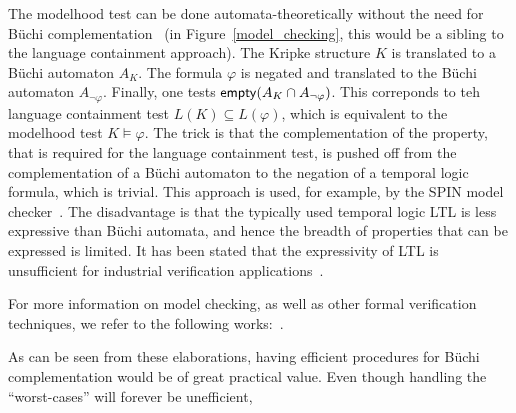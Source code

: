 The modelhood test can be done automata-theoretically without the need for Büchi complementation~\cite{2007_vardi_model_checking} (in Figure~\ref{model_checking}, this would be a sibling to the language containment approach). The Kripke structure $K$ is translated to a Büchi automaton $A_K$. The formula $\varphi$ is negated and translated to the Büchi automaton $A_{\neg\varphi}$. Finally, one tests $\text{\textsf{empty}}(A_K \cap A_{\neg\varphi})$. This correponds to teh language containment test $L(K) \subseteq L(\varphi)$, which is equivalent to the modelhood test $K \models \varphi$. The trick is that the complementation of the property, that is required for the language containment test, is pushed off from the complementation of a Büchi automaton to the negation of a temporal logic formula, which is trivial. This approach is used, for example, by the SPIN model checker~\cite{1997_spin}. The disadvantage is that the typically used temporal logic LTL is less expressive than Büchi automata, and hence the breadth of properties that can be expressed is limited. It has been stated that the expressivity of LTL is unsufficient for industrial verification applications~\cite{2007_vardi_model_checking}.

For more information on model checking, as well as other formal verification techniques, we refer to the following works:~\cite{huth2004logic}\cite{ben2012mathematical}\cite{baier2008principles}.

As can be seen from these elaborations, having efficient procedures for Büchi complementation would be of great practical value. Even though handling the ``worst-cases'' will forever be unefficient,






